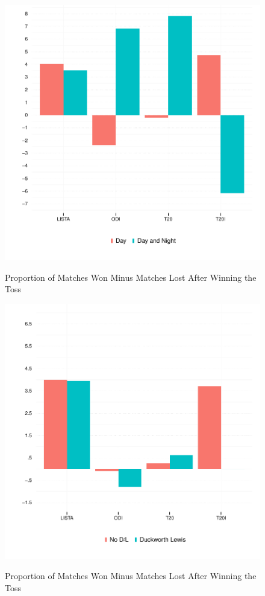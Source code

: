 \documentclass[11pt]{article}
\begin{document}
\begin{figure}[htbp]
\centering
\caption{Proportion of Matches Won Minus Matches Lost After Winning the Toss}
\includegraphics[scale=.75]{../figs/winbyDayNight.pdf}
\label{fig:summary}
\end{figure}


\begin{figure}[htbp]
\centering
\caption{Proportion of Matches Won Minus Matches Lost After Winning the Toss}
\includegraphics[scale=.75]{../figs/winbyDL.pdf}
\label{fig:summary}
\end{figure}
\end{document}
